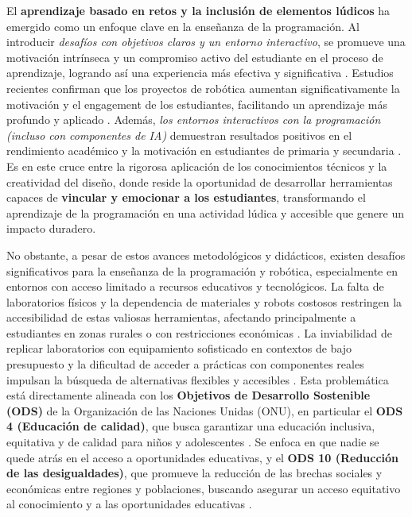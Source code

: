 El \textbf{ aprendizaje basado en retos y la inclusión de elementos lúdicos } ha emergido como un enfoque clave en la enseñanza de la programación. Al introducir  \textit{desafíos con objetivos claros y un entorno interactivo}, se promueve una motivación intrínseca y un compromiso activo del estudiante en el proceso de aprendizaje, logrando así una experiencia más efectiva y significativa \cite{Campana2016}. Estudios recientes confirman que los proyectos de robótica aumentan significativamente la motivación y el engagement de los estudiantes, facilitando un aprendizaje más profundo y aplicado \cite{Dominguez2024_MotivationRobotics}. Además, \textit{los entornos interactivos con la programación (incluso con componentes de IA)}  demuestran resultados positivos en el rendimiento académico y la motivación en estudiantes de primaria y secundaria \cite{Alshahrani2024_GamifiedBlock}. Es en este cruce entre la rigorosa aplicación de los conocimientos técnicos y la creatividad del diseño, donde reside la oportunidad de desarrollar herramientas capaces de \textbf{vincular y emocionar a los estudiantes}, transformando el aprendizaje de la programación en una actividad lúdica y accesible que genere un impacto duradero. 

No obstante, a pesar de estos avances metodológicos y didácticos, existen desafíos significativos para la enseñanza de la programación y robótica, especialmente en entornos con acceso limitado a recursos educativos y tecnológicos. La falta de laboratorios físicos y la dependencia de materiales y robots costosos restringen la accesibilidad de estas valiosas herramientas, afectando principalmente a estudiantes en zonas rurales o con restricciones económicas \cite{Paredes2022, Lemus2006_JENUI}. La inviabilidad de replicar laboratorios con equipamiento sofisticado en contextos de bajo presupuesto y la dificultad de acceder a prácticas con componentes reales impulsan la búsqueda de alternativas flexibles y accesibles \cite{Paredes2022}. Esta problemática está directamente alineada con los \textbf{Objetivos de Desarrollo Sostenible (ODS)} de la Organización de las Naciones Unidas (ONU), en particular el \textbf{ODS 4 (Educación de calidad)}, que busca garantizar una educación inclusiva, equitativa y de calidad para niños y adolescentes \cite{ONU-ODS}. Se enfoca en que nadie se quede atrás en el acceso a oportunidades educativas, y el \textbf{ODS 10 (Reducción de las desigualdades)}, que promueve la reducción de las brechas sociales y económicas entre regiones y poblaciones, buscando asegurar un acceso equitativo al conocimiento y a las oportunidades educativas \cite{ONU-ODS}.

